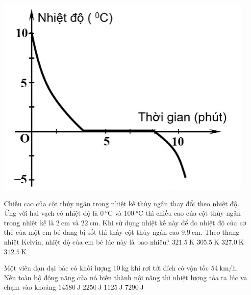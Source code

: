 \begin{ex}
	{\includegraphics[width=0.6\linewidth]{../figs/D12-1-1}}
	\loigiai{}
\end{ex}
\begin{ex}
	Chiều cao của cột thủy ngân trong nhiệt kế thủy ngân thay đổi theo nhiệt độ. Ứng với hai vạch có nhiệt độ là $\SI{0}{\celsius}$ và $\SI{100}{\celsius}$ thì chiều cao của cột thủy ngân trong nhiệt kế là $\SI{2}{\centi\meter}$ và $\SI{22}{\centi\meter}$. Khi sử dụng nhiệt kế này để đo nhiệt độ của cơ thể của một em bé đang bị sốt thì thấy cột thủy ngân cao $\SI{9.9}{\centi\meter}$. Theo thang nhiệt Kelvin, nhiệt độ của em bé lúc này là bao nhiêu?
	\choice
	{$\SI{321.5}{\kelvin}$}
	{$\SI{305.5}{\kelvin}$}
	{$\SI{327.0}{\kelvin}$}
	{\True $\SI{312.5}{\kelvin}$}
\end{ex}
\begin{ex}
	Một viên đạn đại bác có khối lượng $\SI{10}{\kilogram}$ khi rơi tới đích có vận tốc $\SI{54}{\kilo\meter/\hour}$. Nếu toàn bộ động năng của nó biến thành nội năng thì nhiệt lượng tỏa ra lúc va chạm vào khoảng
	\choice
	{$\SI{14580}{\joule}$}
	{$\SI{2250}{\joule}$}
	{\True $\SI{1125}{\joule}$}
	{$\SI{7290}{\joule}$}
\end{ex}
